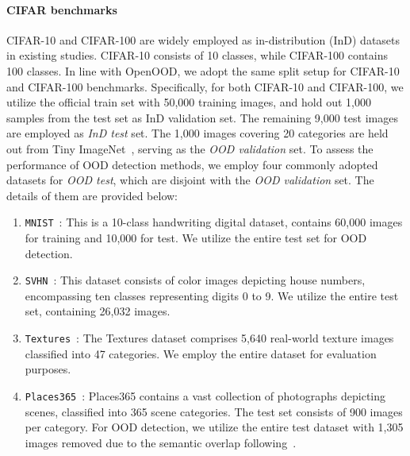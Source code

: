 \documentclass{article} \usepackage{iclr2024_conference,times}
\begin{document}
\paragraph{CIFAR benchmarks}
CIFAR-10 and CIFAR-100 are widely employed as in-distribution (InD) datasets in existing studies. CIFAR-10 consists of 10 classes, while CIFAR-100 contains 100 classes. 
In line with OpenOOD, we adopt the same split setup for CIFAR-10 and CIFAR-100 benchmarks.
Specifically, for both CIFAR-10 and CIFAR-100, we utilize the official train set with 50,000 training images, and hold out 1,000 samples from the test set as InD validation set. The remaining 9,000 test images are employed as \textit{InD test} set. 
The 1,000 images covering 20 categories are held out from Tiny ImageNet~\citep{OOD_Dataset:TinyImg}, serving as the \textit{OOD validation} set.
To assess the performance of OOD detection methods, we employ four commonly adopted datasets for \textit{OOD test}, which are disjoint with the \textit{OOD validation} set. The details of them are provided below:
\begin{enumerate}
	\item \texttt{MNIST}~\citep{OOD_Dataset:MNIST}: This is a 10-class handwriting digital dataset, contains 60,000 images for training	and 10,000 for test. We utilize the entire test set for OOD detection.
	
	\item \texttt{SVHN}~\citep{OOD_Dataset:SVHN}: This dataset consists of color images depicting house numbers, encompassing ten classes representing digits 0 to 9. We utilize the entire test set, containing 26,032 images.

	\item \texttt{Textures}~\citep{OOD_Dataset:Textures}: The Textures dataset comprises 5,640 real-world texture images classified into 47 categories. We employ the entire dataset for evaluation purposes.

	\item \texttt{Places365}~\citep{OOD_Dataset:Places}: Places365 contains a vast collection of photographs depicting scenes, classified into 365 scene categories. The test set consists of 900 images per category. 
	For OOD detection, we utilize the entire test dataset with 1,305 images removed due to the semantic overlap following~\citep{Setup:OpenOOD}.
	
	



\end{enumerate}
\end{document}
